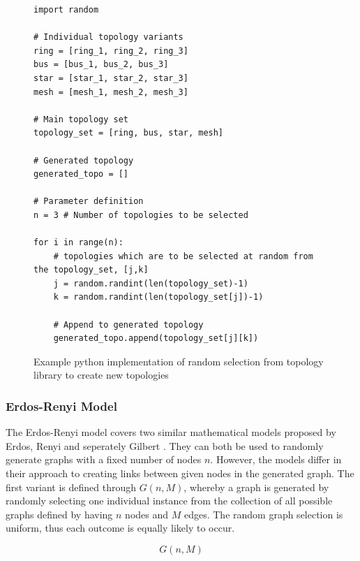 \begin{figure}
    \centering
    \begin{lstlisting}
import random 

# Individual topology variants
ring = [ring_1, ring_2, ring_3]
bus = [bus_1, bus_2, bus_3]
star = [star_1, star_2, star_3]
mesh = [mesh_1, mesh_2, mesh_3]

# Main topology set
topology_set = [ring, bus, star, mesh]

# Generated topology
generated_topo = []

# Parameter definition
n = 3 # Number of topologies to be selected

for i in range(n):
    # topologies which are to be selected at random from the topology_set, [j,k]
    j = random.randint(len(topology_set)-1)
    k = random.randint(len(topology_set[j])-1)

    # Append to generated topology 
    generated_topo.append(topology_set[j][k])

\end{lstlisting}
    \caption{Example python implementation of random selection from topology library to create new topologies}
    \label{fig:topology_library}
\end{figure}

\subsubsection{Erdos-Renyi Model}
The Erdos-Renyi model \cite{Erdos_renyi_origin} covers two similar mathematical models proposed by Erdos, Renyi and seperately Gilbert \cite{gilbert_background}. They can both be used to randomly generate graphs with a fixed number of nodes $n$. However, the models differ in their approach to creating links between given nodes in the generated graph. The first variant is defined through $G(n,M)$, whereby a graph is generated by randomly selecting one individual instance from the collection of all possible graphs defined by having $n$ nodes and $M$ edges. The random graph selection is uniform, thus each outcome is equally likely to occur. 

\begin{equation}
    G(n,M)
\end{equation}


